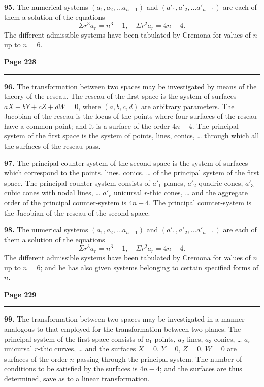 \documentclass[12pt,a4paper]{article}
\theoremstyle{plain}
\theoremstyle{definition}
\theoremstyle{remark}
\begin{document}
\textbf{95.} The numerical systems $(a_1, a_2, \ldots a_{n-1})$ and $(a'_1, a'_2, \ldots a'_{n-1})$ are each of them a solution of the equations
\[
\Sigma r^3 a_r = n^3 - 1, \quad \Sigma r^2 a_r = 4n - 4.
\]
The different admissible systems have been tabulated by Cremona for values of $n$ up to $n = 6$.

\newpage
\noindent\textbf{Page 228}\\
\noindent\rule{\textwidth}{0.4pt}

\smallskip

\noindent\textbf{96.} The transformation between two spaces may be investigated by means of the theory of the reseau. The reseau of the first space is the system of surfaces $aX + bY + cZ + dW = 0$, where $(a, b, c, d)$ are arbitrary parameters. The Jacobian of the reseau is the locus of the points where four surfaces of the reseau have a common point; and it is a surface of the order $4n - 4$. The principal system of the first space is the system of points, lines, conics, \ldots{} through which all the surfaces of the reseau pass.

\textbf{97.} The principal counter-system of the second space is the system of surfaces which correspond to the points, lines, conics, \ldots{} of the principal system of the first space. The principal counter-system consists of $a'_1$ planes, $a'_2$ quadric cones, $a'_3$ cubic cones with nodal lines, \ldots{} $a'_r$ unicursal $r$-thic cones, \ldots{} and the aggregate order of the principal counter-system is $4n - 4$. The principal counter-system is the Jacobian of the reseau of the second space.

\textbf{98.} The numerical systems $(a_1, a_2, \ldots a_{n-1})$ and $(a'_1, a'_2, \ldots a'_{n-1})$ are each of them a solution of the equations
\[
\Sigma r^3 a_r = n^3 - 1, \quad \Sigma r^2 a_r = 4n - 4.
\]
The different admissible systems have been tabulated by Cremona for values of $n$ up to $n = 6$; and he has also given systems belonging to certain specified forms of $n$.

\newpage
\noindent\textbf{Page 229}\\
\noindent\rule{\textwidth}{0.4pt}

\smallskip

\noindent\textbf{99.} The transformation between two spaces may be investigated in a manner analogous to that employed for the transformation between two planes. The principal system of the first space consists of $a_1$ points, $a_2$ lines, $a_3$ conics, \ldots{} $a_r$ unicursal $r$-thic curves, \ldots{} and the surfaces $X = 0$, $Y = 0$, $Z = 0$, $W = 0$ are surfaces of the order $n$ passing through the principal system. The number of conditions to be satisfied by the surfaces is $4n - 4$; and the surfaces are thus determined, save as to a linear transformation.
\end{document}
